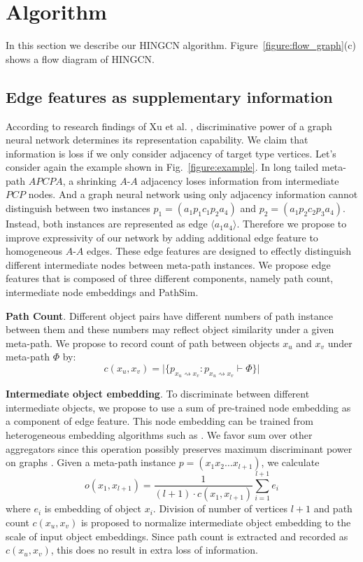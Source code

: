 \section{Algorithm}
\label{sec:algorithm}

In this section we describe our HINGCN algorithm. Figure~\ref{figure:flow_graph}(c) shows a flow diagram of HINGCN. 

\subsection{Edge features as supplementary information}
\label{sec:edge}
According to research findings of Xu et al. \cite{XuHLJ19}, discriminative power of a graph neural network determines its representation capability.
We claim that information is loss if we only consider adjacency of target type vertices.
Let's consider again the example shown in Fig.~\ref{figure:example}. In long tailed meta-path $APCPA$, a shrinking $A$-$A$ adjacency loses information from intermediate $PCP$ nodes. And a graph neural network using only adjacency information cannot distinguish between two instances $p_1 = (a_1 p_1 c_1 p_2 a_4)$ and $p_2 = (a_1 p_2 c_2 p_3 a_4)$. Instead, both instances are represented as edge $\langle a_1 a_4\rangle$.
Therefore we propose to improve expressivity of our network by adding additional edge feature to homogeneous $A$-$A$ edges. These edge features are designed to effectly distinguish different intermediate nodes between meta-path instances.
We propose edge features that is composed of three different components, namely path count, intermediate node embeddings and PathSim\citep{SunHYYW11}.

\noindent{\small$\bullet$}\textbf{Path Count}. Different object pairs have different numbers of path instance between them and these numbers may reflect object similarity under a given meta-path. We propose to record count of path between objects $x_u$ and $x_v$ under meta-path $\Phi$ by: 
\begin{equation*}
c(x_u,x_v) = \vert\{ p_{x_u \rightsquigarrow x_v}:p_{x_u \rightsquigarrow x_v} \vdash \Phi \}\vert
\end{equation*}

\noindent{\small$\bullet$}\textbf{Intermediate object embedding}. 
To discriminate between different intermediate objects, we propose to use a sum of pre-trained node embedding as a component of edge feature. This node embedding can be trained from heterogeneous embedding algorithms such as \cite{GroverL16,DongCS17}. We favor sum over other aggregators since this operation possibly preserves maximum discriminant power on graphs \citep{XuHLJ19}.
Given a meta-path instance $p = (x_1x_2\ldots x_{l+1})$, we calculate
\begin{equation*}
o(x_1,x_{l+1}) = \dfrac{1}{(l+1) \cdot c(x_1,x_{l+1})} \sum\limits_{i=1}^{l+1} e_i
\end{equation*}
where $e_i$ is embedding of object $x_i$. Division of number of vertices $l+1$ and path count $c(x_u,x_v)$ is proposed to normalize intermediate object embedding to the scale of input object embeddings. Since path count is extracted and recorded as $c(x_u,x_v)$, this does no result in extra loss of information.

